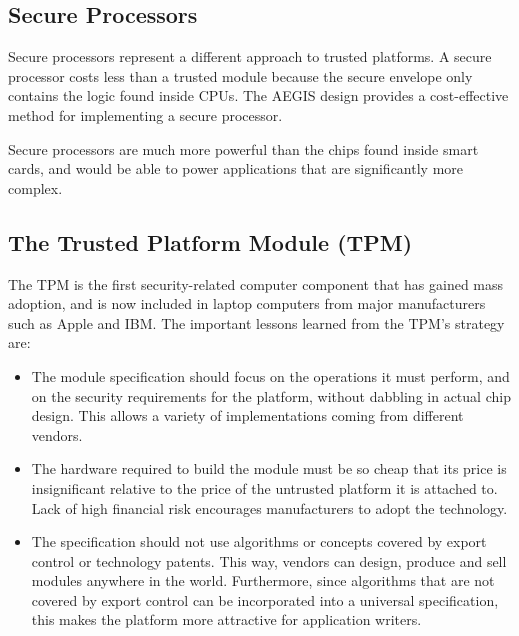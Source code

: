 \subsection{Secure Processors}
Secure processors represent a different approach to trusted platforms. A secure
processor costs less than a trusted module because the secure envelope only
contains the logic found inside CPUs. The AEGIS \cite{suh2003aat} design
provides a cost-effective method for implementing a secure processor.

Secure processors are much more powerful than the chips found inside
smart cards, and would be able to power applications that are significantly more
complex.


\subsection{The Trusted Platform Module (TPM)}\label{intro:tpm}
The TPM is the first security-related computer component that has gained mass
adoption, and is now included in laptop computers from major manufacturers such
as Apple and IBM. The important lessons learned from the TPM's strategy are:

\begin {itemize}
  \item The module specification should focus on the operations it must perform,
  and on the security requirements for the platform, without dabbling in actual
  chip design. This allows a variety of implementations coming from different
  vendors.
  \item The hardware required to build the module must be so cheap that its
  price is insignificant relative to the price of the untrusted platform it is
  attached to. Lack of high financial risk encourages manufacturers to adopt
  the technology.
  \item The specification should not use algorithms or concepts covered by
  export control or technology patents. This way, vendors can design, produce
  and sell modules anywhere in the world. Furthermore, since algorithms that are
  not covered by export control can be incorporated into a universal
  specification, this makes the platform more attractive for application
  writers.
\end{itemize}


